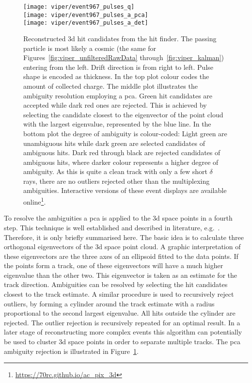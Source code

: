 \begin{figure}[tbp]
	\begin{minipage}{\textwidth}
		\centering
		\texttt{[image: viper/event967\_pulses\_q]} \\
		\texttt{[image: viper/event967\_pulses\_a\_pca]} \\
		\texttt{[image: viper/event967\_pulses\_a\_det]}
		\caption[Reconstructed  hits of typical pixel demonstrator event]{%
			Reconstructed \acrshort{3d} hit candidates from the hit finder.
			The passing particle is most likely a cosmic \Pgm (the same for Figures~\ref{fig:viper_unfilteredRawData} through~\ref{fig:viper_kalman}) entering from the left.
			Drift direction is from right to left.
			Pulse shape is encoded as thickness.
			In the top plot colour codes the amount of collected charge.
			The middle plot illustrates the ambiguity resolution employing a \acrshort{pca}.
			Green hit candidates are accepted while dark red ones are rejected.
			This is achieved by selecting the candidate closest to the eigenvector of the point cloud with the largest eigenvalue, represented by the blue line.
			In the bottom plot the degree of ambiguity is colour-coded: Light green are unambiguous hits while dark green are selected candidates of ambiguous hits.
			Dark red through black are rejected candidates of ambiguous hits, where darker colour represents a higher degree of ambiguity.
			As this is quite a clean track with only a few short $\delta$ rays, there are no outliers rejected other than the multiplexing ambiguities.
			Interactive versions of these event displays are available online\footnote{\url{https://70rc.github.io/ac_pix_3d}}.
		}
		\label{fig:viper_pca}
	\end{minipage}
\end{figure}

To resolve the ambiguities a \gls{pca} is applied to the \gls{3d} space points in a fourth step.
This technique is well established and described in literature, e.g.~\cite{pca}.
Therefore, it is only briefly summarised here.
The basic idea is to calculate three orthogonal eigenvectors of the \gls{3d} space point cloud.
A graphic interpretation of these eigenvectors are the three axes of an ellipsoid fitted to the data points.
If the points form a track, one of these eigenvectors will have a much higher eigenvalue than the other two.
This eigenvector is taken as an estimate for the track direction.
Ambiguities can be resolved by selecting the hit candidates closest to the track estimate.
A similar procedure is used to recursively reject outliers, by forming a cylinder around the track estimate with a radius proportional to the second largest eigenvalue.
All hits outside the cylinder are rejected.
The outlier rejection is recursively repeated for an optimal result.
In a later stage of reconstructing more complex events this algorithm can potentially be used to cluster \gls{3d} space points in order to separate multiple tracks.
The \gls{pca} ambiguity rejection is illustrated in Figure~\ref{fig:viper_pca}.

